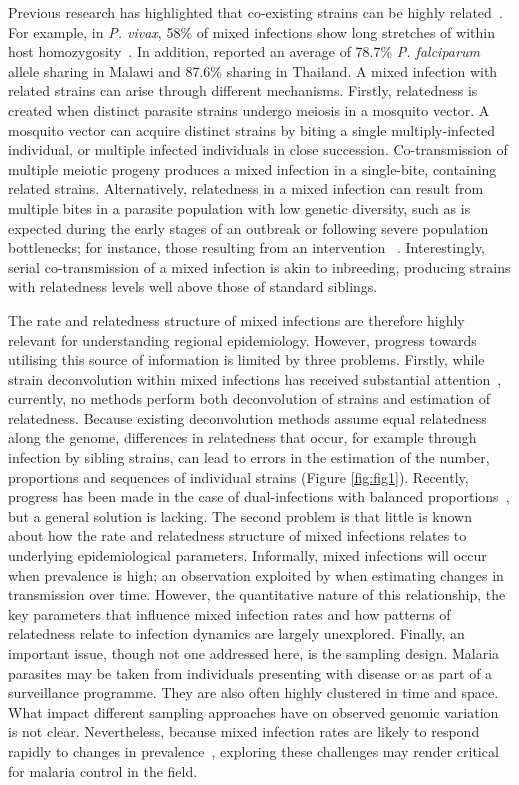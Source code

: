 \documentclass[9pt,lineno]{elife}
\begin{document}
Previous research has highlighted that co-existing strains can be highly related~\citep{Nair2014, Trevino2017}.  For example, in {\it P. vivax}, 58\% of mixed infections show long stretches of within host homozygosity~\citep{Pearson2016}. In addition, \citet{Nkhoma2012} reported an average of 78.7\% {\it P. falciparum} allele sharing in Malawi and 87.6\% sharing in Thailand. A mixed infection with related strains can arise through different mechanisms. Firstly, relatedness is created when distinct parasite strains undergo meiosis in a mosquito vector. A mosquito vector can acquire distinct strains by biting a single multiply-infected individual, or multiple infected individuals in close succession.  Co-transmission of multiple meiotic progeny produces a mixed infection in a single-bite, containing related strains.  Alternatively, relatedness in a mixed infection can result from multiple bites in a parasite population with low genetic diversity, such as is expected during the early stages of an outbreak or following severe population bottlenecks; for instance, those resulting from an intervention ~\citep{Mouzin2010, Wong2017, Daniels2015}. Interestingly, serial co-transmission of a mixed infection is akin to inbreeding, producing strains with relatedness levels well above those of standard siblings.

The rate and relatedness structure of mixed infections are therefore highly relevant for understanding regional epidemiology.  However, progress towards utilising this source of information is limited by three problems.  Firstly, while strain deconvolution within mixed infections has received substantial attention~\citep{Galinsky2015, Jack2016, Chang2017, Zhu2017}, currently, no methods perform both deconvolution of strains and estimation of relatedness.  Because existing deconvolution methods assume equal relatedness along the genome, differences in relatedness that occur, for example through infection by sibling strains, can lead to errors in the estimation of the number, proportions and sequences of individual strains (Figure \ref{fig:fig1}).  Recently, progress has been made in the case of dual-infections with balanced proportions~\citep{Henden2016}, but a general solution is lacking.  The second problem is that little is known about how the rate and relatedness structure of mixed infections relates to underlying epidemiological parameters.  Informally, mixed infections will occur when prevalence is high; an observation exploited by \citet{Cerqueira2017} when estimating changes in transmission over time.  However, the quantitative nature of this relationship, the key parameters that influence mixed infection rates and how patterns of relatedness relate to infection dynamics are largely unexplored.  Finally, an important issue, though not one addressed here, is the sampling design.  Malaria parasites may be taken from individuals presenting with disease or as part of a surveillance programme.  They are also often highly clustered in time and space.  What impact different sampling approaches have on observed genomic variation is not clear.  Nevertheless, because mixed infection rates are likely to respond rapidly to changes in prevalence~\citep{volkman2012}, exploring these challenges may render critical for malaria control in the field.
\end{document}
